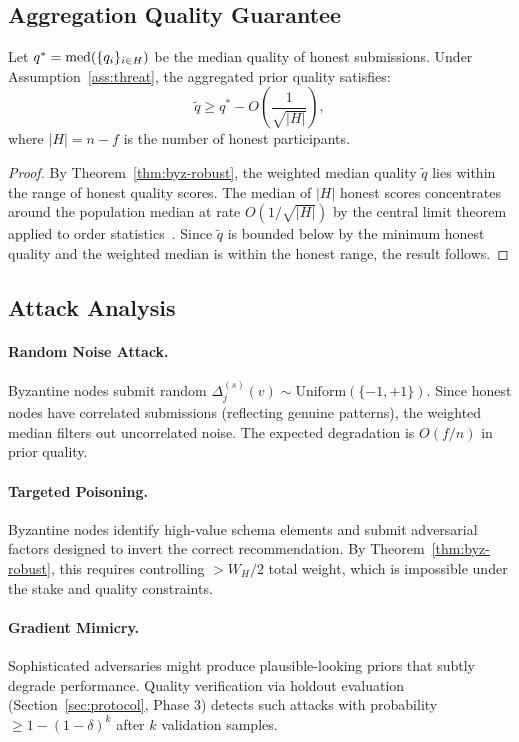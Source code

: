 \subsection{Aggregation Quality Guarantee}

\begin{theorem}
\label{thm:quality}
Let $q^* = \operatorname{med}(\{q_i\}_{i \in H})$ be the median quality of honest
submissions. Under Assumption~\ref{ass:threat}, the aggregated prior quality
satisfies:
\begin{equation}
    \tilde{q} \geq q^* - O\left(\frac{1}{\sqrt{|H|}}\right),
\end{equation}
where $|H| = n - f$ is the number of honest participants.
\end{theorem}

\begin{proof}
By Theorem~\ref{thm:byz-robust}, the weighted median quality $\tilde{q}$ lies
within the range of honest quality scores. The median of $|H|$ honest scores
concentrates around the population median at rate $O(1/\sqrt{|H|})$ by the
central limit theorem applied to order statistics~\cite{david2003order}. Since
$\tilde{q}$ is bounded below by the minimum honest quality and the weighted
median is within the honest range, the result follows.
\end{proof}

\subsection{Attack Analysis}

\paragraph{Random Noise Attack.}
Byzantine nodes submit random $\Delta_j^{(s)}(v) \sim \text{Uniform}(\{-1, +1\})$.
Since honest nodes have correlated submissions (reflecting genuine patterns),
the weighted median filters out uncorrelated noise. The expected degradation is
$O(f/n)$ in prior quality.

\paragraph{Targeted Poisoning.}
Byzantine nodes identify high-value schema elements and submit adversarial
factors designed to invert the correct recommendation. By
Theorem~\ref{thm:byz-robust}, this requires controlling $> W_H / 2$ total
weight, which is impossible under the stake and quality constraints.

\paragraph{Gradient Mimicry.}
Sophisticated adversaries might produce plausible-looking priors that subtly
degrade performance. Quality verification via holdout evaluation
(Section~\ref{sec:protocol}, Phase 3) detects such attacks with probability
$\geq 1 - (1-\delta)^k$ after $k$ validation samples.

